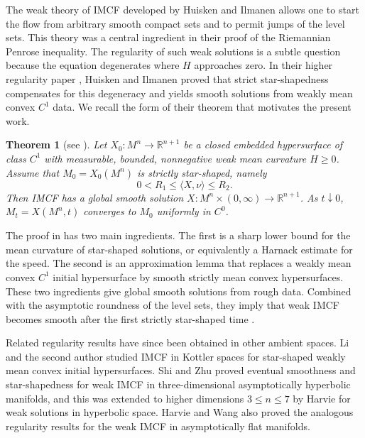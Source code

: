 \documentclass[11pt,reqno]{amsart}
\newtheorem{theorem}[proposition]{Theorem}
\theoremstyle{definition}
\theoremstyle{remark}
\numberwithin{equation}{section}
\begin{document}
	The weak theory of IMCF developed by Huisken and Ilmanen \cite{HI01} allows one to start the flow from arbitrary smooth compact sets and to permit jumps of the level sets. This theory was a central ingredient in their proof of the Riemannian Penrose inequality. The regularity of such weak solutions is a subtle question because the equation degenerates where $H$ approaches zero. In their higher regularity paper \cite{HI08}, Huisken and Ilmanen proved that strict star-shapedness compensates for this degeneracy and yields smooth solutions from weakly mean convex $C^1$ data. We recall the form of their theorem that motivates the present work.
	
	\begin{theorem}[see {\cite[Theorem 2.5]{HI08}}]
		\label{higher-HI}
		Let $X_0:M^n\to\mathbb{R}^{n+1}$ be a closed embedded hypersurface of class $C^1$ with measurable, bounded, nonnegative weak mean curvature $H\geq 0$. Assume that $M_0=X_0(M^n)$ is strictly star-shaped, namely
		\begin{equation*}
			0<R_1\leq \langle X,\nu\rangle\leq R_2.
		\end{equation*}
		Then IMCF has a global smooth solution $X:M^n\times(0,\infty)\to\mathbb{R}^{n+1}$. As $t\downarrow 0$, $M_t=X(M^n,t)$ converges to $M_0$ uniformly in $C^0$. 
	\end{theorem}
	
	The proof in \cite{HI08} has two main ingredients. The first is a sharp lower bound for the mean curvature of star-shaped solutions, or equivalently a Harnack estimate for the speed. The second is an approximation lemma that replaces a weakly mean convex $C^1$ initial hypersurface by smooth strictly mean convex hypersurfaces. These two ingredients give global smooth solutions from rough data. Combined with the asymptotic roundness of the level sets, they imply that weak IMCF becomes smooth after the first strictly star-shaped time \cite[Theorem 2.7]{HI08}.
	
	Related regularity results have since been obtained in other ambient spaces. Li and the second author \cite{LW17} studied IMCF in Kottler spaces for star-shaped weakly mean convex initial hypersurfaces. Shi and Zhu \cite{SZ21} proved eventual smoothness and star-shapedness for weak IMCF in three-dimensional asymptotically hyperbolic manifolds, and this was extended to higher dimensions $3\leq n\leq 7$ by Harvie \cite{Har24} for weak solutions in hyperbolic space. Harvie and Wang \cite{HarW25} also proved the analogous regularity results for the weak IMCF in asymptotically flat manifolds.
	
\end{document}
